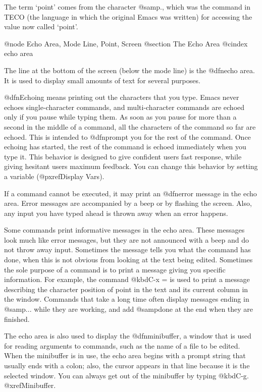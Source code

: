   The term `point' comes from the character @samp{.}, which was the
command in TECO (the language in which the original Emacs was written)
for accessing the value now called `point'.



@node Echo Area, Mode Line, Point, Screen
@section The Echo Area
@cindex echo area

  The line at the bottom of the screen (below the mode line) is the
@dfn{echo area}.  It is used to display small amounts of text for several
purposes.

  @dfn{Echoing} means printing out the characters that you type.  Emacs
never echoes single-character commands, and multi-character commands are
echoed only if you pause while typing them.  As soon as you pause for more
than a second in the middle of a command, all the characters of the command
so far are echoed.  This is intended to @dfn{prompt} you for the rest of
the command.  Once echoing has started, the rest of the command is echoed
immediately when you type it.  This behavior is designed to give confident
users fast response, while giving hesitant users maximum feedback.  You
can change this behavior by setting a variable (@pxref{Display Vars}).

  If a command cannot be executed, it may print an @dfn{error message} in
the echo area.  Error messages are accompanied by a beep or by flashing the
screen.  Also, any input you have typed ahead is thrown away when an error
happens.

  Some commands print informative messages in the echo area.  These
messages look much like error messages, but they are not announced with a
beep and do not throw away input.  Sometimes the message tells you what the
command has done, when this is not obvious from looking at the text being
edited.  Sometimes the sole purpose of a command is to print a message
giving you specific information.  For example, the command @kbd{C-x =} is
used to print a message describing the character position of point in the
text and its current column in the window.  Commands that take a long time
often display messages ending in @samp{...} while they are working, and
add @samp{done} at the end when they are finished.

  The echo area is also used to display the @dfn{minibuffer}, a window that
is used for reading arguments to commands, such as the name of a file to be
edited.  When the minibuffer is in use, the echo area begins with a prompt
string that usually ends with a colon; also, the cursor appears in that line
because it is the selected window.  You can always get out of the
minibuffer by typing @kbd{C-g}.  @xref{Minibuffer}.

